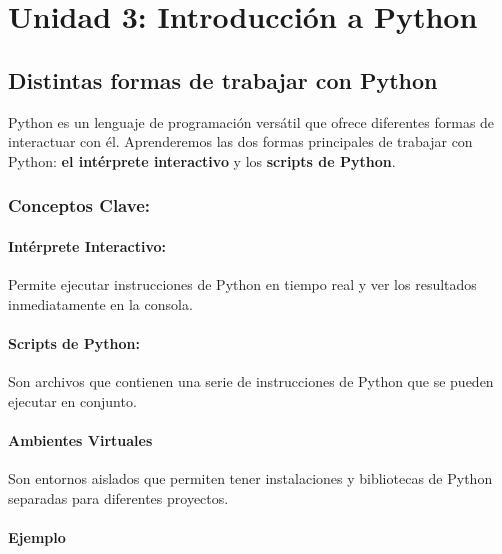 \documentclass[
  a4paper,
  DIV=11,
  numbers=noendperiod,
  onepage,
  openany]{scrreprt}
\begin{document}
\part{Unidad 3: Introducción a Python}

\hypertarget{distintas-formas-de-trabajar-con-python}{%
\chapter{Distintas formas de trabajar con
Python}\label{distintas-formas-de-trabajar-con-python}}

Python es un lenguaje de programación versátil que ofrece diferentes
formas de interactuar con él. Aprenderemos las dos formas principales de
trabajar con Python: \textbf{el intérprete interactivo} y los
\textbf{scripts de Python}.

\hypertarget{conceptos-clave-3}{%
\section{Conceptos Clave:}\label{conceptos-clave-3}}

\hypertarget{intuxe9rprete-interactivo}{%
\subsection{Intérprete Interactivo:}\label{intuxe9rprete-interactivo}}

Permite ejecutar instrucciones de Python en tiempo real y ver los
resultados inmediatamente en la consola.

\hypertarget{scripts-de-python}{%
\subsection{Scripts de Python:}\label{scripts-de-python}}

Son archivos que contienen una serie de instrucciones de Python que se
pueden ejecutar en conjunto.

\hypertarget{ambientes-virtuales}{%
\subsection{Ambientes Virtuales}\label{ambientes-virtuales}}

Son entornos aislados que permiten tener instalaciones y bibliotecas de
Python separadas para diferentes proyectos.

\hypertarget{ejemplo-3}{%
\subsection{Ejemplo}\label{ejemplo-3}}
\end{document}
